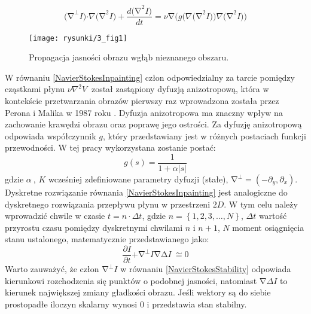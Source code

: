 \documentclass[12pt, twoside, openany]{report}
\theoremstyle{definition}
\begin{document}
\begin{equation}
{\mathrm{(}\mathrm{\nabla }}^{\mathrm{\bot }}I\mathrm{)}\mathrm{\cdot }\nabla {\mathrm{(}\mathrm{\nabla }}^{\mathrm{2}}I\mathrm{)+}\frac{d{\mathrm{(}\mathrm{\nabla }}^{\mathrm{2}}I\mathrm{)}}{dt}\mathrm{=}\nu \mathrm{\nabla }\mathrm{(}g\mathrm{(}\nabla {\mathrm{(}\mathrm{\nabla }}^{\mathrm{2}}I\mathrm{))}\nabla {\mathrm{(}\mathrm{\nabla }}^{\mathrm{2}}I\mathrm{))} 
\label{NavierStokesInpainting}
\end{equation}
\begin{figure}[!h]
	\centering
	\texttt{[image: rysunki/3\_fig1]}
	\caption{Propagacja jasności obrazu wgłąb nieznanego obszaru.}
	\label{3_fig1}
\end{figure}
W równaniu \eqref{NavierStokesInpainting} człon odpowiedzialny za tarcie pomiędzy cząstkami płynu $\nu {\nabla }^2V\ $ został zastąpiony dyfuzją anizotropową, która w kontekście przetwarzania obrazów pierwszy raz wprowadzona została przez Perona i Malika w 1987 roku \cite{perona1990scale}. Dyfuzja anizotropowa ma znaczny wpływ na zachowanie krawędzi obrazu oraz poprawę jego ostrości. Za dyfuzję anizotropową odpowiada współczynnik $g$, który przedstawiany jest w różnych postaciach funkcji przewodności. W tej pracy wykorzystana zostanie postać:
\begin{equation}
g\left(s\right)=\frac{1}{1+\alpha \left|s\right|}
\end{equation}
gdzie $\alpha\ $, $K$ wcześniej zdefiniowane parametry dyfuzji (stałe), ${\mathrm{\nabla }}^{\bot }=({-\partial }_y,{\partial }_x)$. 
Dyskretne rozwiązanie równania \eqref{NavierStokesInpainting} jest analogiczne do dyskretnego rozwiązania przepływu płynu w przestrzeni $2D$. W tym celu należy wprowadzić chwile w czasie $t=n\cdot \Delta t$, gdzie $n=\left\{1,2,3,\dots ,N\right\}$, $\Delta t$ wartość przyrostu czasu pomiędzy dyskretnymi chwilami $n$ i $n+1$, $N$ moment osiągnięcia stanu ustalonego, matematycznie przedstawianego jako:
\begin{equation}
\frac{\partial I}{\partial t}\mathrm{+}{\mathrm{\nabla }}^{\mathrm{\bot }}I\mathrm{\nabla }\mathrm{\Delta }I\mathrm{\ }\mathrm{\cong }\mathrm{0}
\label{NavierStokesStability}
\end{equation}
Warto zauważyć, że człon ${\mathrm{\nabla }}^{\bot }I$ w równaniu \eqref{NavierStokesStability} odpowiada kierunkowi rozchodzenia się punktów o podobnej jasności, natomiast $\mathrm{\nabla }\Delta I$ to kierunek największej zmiany gładkości obrazu. Jeśli wektory są do siebie prostopadłe  iloczyn skalarny wynosi 0 i przedstawia stan stabilny. 
\end{document}
